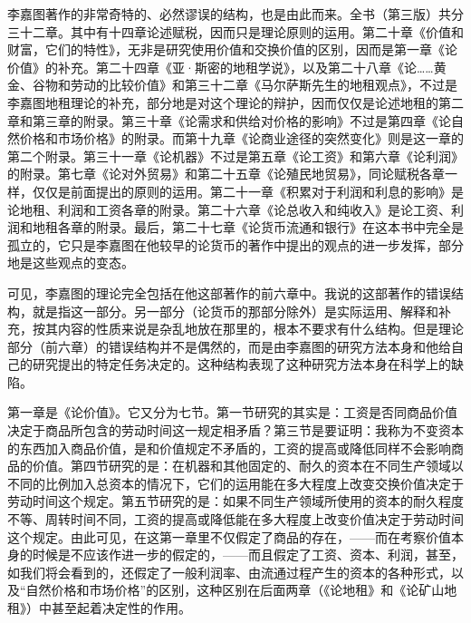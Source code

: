李嘉图著作的非常奇特的、必然谬误的结构，也是由此而来。全书（第三版）共分三十二章。其中有十四章论述赋税，因而只是理论原则的运用。第二十章《价值和财富，它们的特性》，无非是研究使用价值和交换价值的区别，因而是第一章《论价值》的补充。第二十四章《亚·斯密的地租学说》，以及第二十八章《论……黄金、谷物和劳动的比较价值》和第三十二章《马尔萨斯先生的地租观点》，不过是李嘉图地租理论的补充，部分地是对这个理论的辩护，因而仅仅是论述地租的第二章和第三章的附录。第三十章《论需求和供给对价格的影响》不过是第四章《论自然价格和市场价格》的附录。而第十九章《论商业途径的突然变化》则是这一章的第二个附录。第三十一章《论机器》不过是第五章《论工资》和第六章《论利润》的附录。第七章《论对外贸易》和第二十五章《论殖民地贸易》，同论赋税各章一样，仅仅是前面提出的原则的运用。第二十一章《积累对于利润和利息的影响》是论地租、利润和工资各章的附录。第二十六章《论总收入和纯收入》是论工资、利润和地租各章的附录。最后，第二十七章《论货币流通和银行》在这本书中完全是孤立的，它只是李嘉图在他较早的论货币的著作中提出的观点的进一步发挥，部分地是这些观点的变态。

可见，李嘉图的理论完全包括在他这部著作的前六章中。我说的这部著作的错误结构，就是指这一部分。另一部分（论货币的那部分除外）是实际运用、解释和补充，按其内容的性质来说是杂乱地放在那里的，根本不要求有什么结构。但是理论部分（前六章）的错误结构并不是偶然的，而是由李嘉图的研究方法本身和他给自己的研究提出的特定任务决定的。这种结构表现了这种研究方法本身在科学上的缺陷。

第一章是《论价值》。它又分为七节。第一节研究的其实是：工资是否同商品价值决定于商品所包含的劳动时间这一规定相矛盾？第三节是要证明：我称为不变资本的东西加入商品价值，是和价值规定不矛盾的，工资的提高或降低同样不会影响商品的价值。第四节研究的是：在机器和其他固定的、耐久的资本在不同生产领域以不同的比例加入总资本的情况下，它们的运用能在多大程度上改变交换价值决定于劳动时间这个规定。第五节研究的是：如果不同生产领域所使用的资本的耐久程度不等、周转时间不同，工资的提高或降低能在多大程度上改变价值决定于劳动时间这个规定。由此可见，在这第一章里不仅假定了商品的存在，——而在考察价值本身的时候是不应该作进一步的假定的，——而且假定了工资、资本、利润，甚至，如我们将会看到的，还假定了一般利润率、由流通过程产生的资本的各种形式，以及“自然价格和市场价格”的区别，这种区别在后面两章（《论地租》和《论矿山地租》）中甚至起着决定性的作用。

